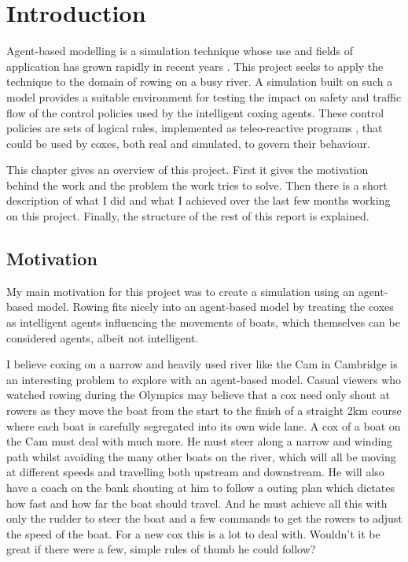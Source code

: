 \chapter{Introduction}\label{chapter:intro}
  Agent-based modelling is a simulation technique whose use and fields of application has grown rapidly in recent years \cite{Bonabeau2002, Miller2010, Chen2010, Helbing2000}. This project seeks to apply the technique to the domain of rowing on a busy river. A simulation built on such a model provides a suitable environment for testing the impact on safety and traffic flow of the control policies used by the intelligent coxing agents. These control policies are sets of logical rules, implemented as teleo-reactive programs \cite{Nilsson1994}, that could be used by coxes, both real and simulated, to govern their behaviour.

  This chapter gives an overview of this project. First it gives the motivation behind the work and the problem the work tries to solve. Then there is a short description of what I did and what I achieved over the last few months working on this project. Finally, the structure of the rest of this report is explained.

  \section{Motivation}
  My main motivation for this project was to create a simulation using an agent-based model. Rowing fits nicely into an agent-based model by treating the coxes as intelligent agents influencing the movements of boats, which themselves can be considered agents, albeit not intelligent.

  I believe coxing on a narrow and heavily used river like the Cam in Cambridge is an interesting problem to explore with an agent-based model. Casual viewers who watched rowing during the Olympics may believe that a cox need only shout at rowers as they move the boat from the start to the finish of a straight 2km course where each boat is carefully segregated into its own wide lane.
  A cox of a boat on the Cam must deal with much more. He must steer along a narrow and
  winding path whilst avoiding the many other boats on the river, which will all be moving at different speeds and travelling both upstream and downstream. He will also
  have a coach on the bank shouting at him to follow a outing plan
  which dictates how fast and how far the boat should travel. And he
  must achieve all this with only the rudder to steer the boat and a few commands to get the rowers to adjust the speed of the boat. For a new cox this is a lot to deal with. Wouldn't it be great if there were a few, simple rules of thumb he could follow?
  
